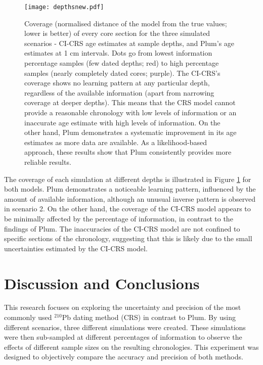 \documentclass [10pt] {article}
\begin{document}
\begin{figure}[!]
	\begin{centering}
		\texttt{[image: depthsnew.pdf]}
		\caption{Coverage (normalised distance of the model from the true values; lower is better) of every core section for the three simulated scenarios - CI-CRS age estimates at sample depths, and Plum's age estimates at 1 cm intervals. Dots go from lowest information percentage samples (few dated depths; red) to high percentage samples (nearly completely dated cores; purple). The CI-CRS's coverage shows no learning pattern at any particular depth, regardless of the available information (apart from narrowing coverage at deeper depths). This means that the CRS model cannot provide a reasonable chronology with low levels of information or an inaccurate age estimate with high levels of information. On the other hand, Plum demonstrates a systematic improvement in its age estimates as more data are available. As a likelihood-based approach, these results show that Plum consistently provides more reliable results.  }
		\label{fig:depths}
	\end{centering}
\end{figure}
The coverage of each simulation at different depths is illustrated in Figure \ref{fig:depths} for both models. Plum demonstrates a noticeable learning pattern, influenced by the amount of available information, although an unusual inverse pattern is observed in scenario 2. On the other hand, the coverage of the CI-CRS model appears to be minimally affected by the percentage of information, in contrast to the findings of Plum. The inaccuracies of the CI-CRS model are not confined to specific sections of the chronology, suggesting that this is likely due to the small uncertainties estimated by the CI-CRS model.


\section{Discussion and Conclusions}

This research focuses on exploring the uncertainty and precision of the most commonly used $^{210}$Pb dating method (CRS) in contrast to Plum.
By using different scenarios, three different simulations were created. These simulations were then sub-sampled at different percentages of information to observe the effects of different sample sizes on the resulting chronologies. This experiment was designed to objectively compare the accuracy and precision of both methods.
\end{document}
